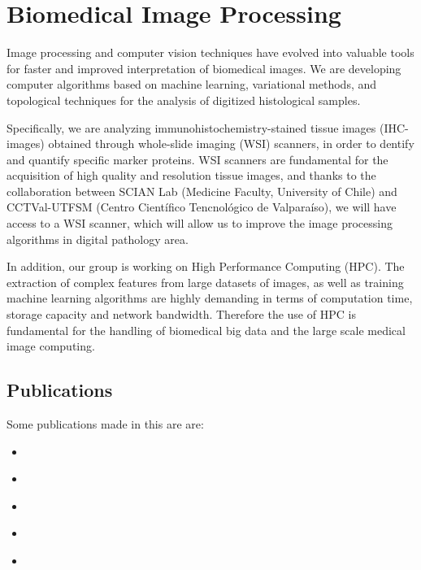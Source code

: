 \section{Biomedical Image Processing}
Image processing and computer vision techniques have evolved into valuable
tools for faster and improved interpretation of biomedical images.
We are developing computer algorithms based on machine learning, variational methods, and topological techniques for the analysis of digitized histological samples.

Specifically, we are analyzing immunohistochemistry-stained tissue images
(IHC-images) obtained through whole-slide imaging (WSI) scanners, in order to
dentify and quantify specific marker proteins.
WSI scanners are fundamental for the acquisition of high
quality and resolution tissue images, and thanks to the collaboration between
SCIAN Lab (Medicine Faculty, University of Chile) and CCTVal-UTFSM (Centro
Cient\'{i}fico Tencnol\'{o}gico de Valpara\'{i}so), we will have
access to a WSI scanner,  which will allow us to improve the image processing
algorithms in digital pathology area.

In addition, our group is working on High Performance Computing (HPC). 
The extraction of complex features from large datasets of images,
as well as training machine learning algorithms are highly demanding in terms of
computation time, storage capacity and network bandwidth. Therefore the use of
HPC is fundamental for the handling of biomedical big
data and the large scale medical image computing. 

\subsection{Publications}

Some publications made in this are are:
\begin{itemize}
\item \cite{pezoa2014}
\item \cite{pezoa2012}
\item \cite{pezoaGold}
\item \cite{pezoa2011b}
\item \cite{pezoa2011a}


\end{itemize}

